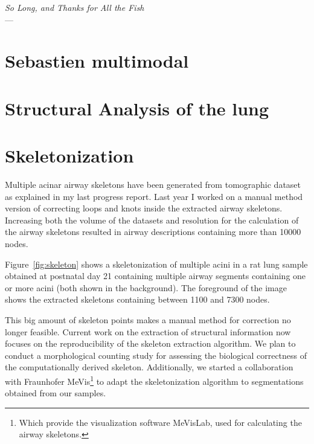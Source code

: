 \acresetall
{}\label{ch:outlook}
\begin{flushright}{\slshape    
		So Long, and Thanks for All the Fish} \\ \medskip
    ---  \citep{Adams1984}
\end{flushright}
\vspace{52mm}

\section{Sebastien multimodal}

\section{Structural Analysis of the lung}

\section{Skeletonization}
Multiple acinar airway skeletons have been generated from tomographic dataset as explained in my last progress report. Last year I worked on a manual method version of correcting loops and knots inside the extracted airway skeletons. Increasing both the volume of the datasets and resolution for the calculation of the airway skeletons resulted in airway descriptions containing more than \num{10000} nodes.

Figure~\ref{fig:skeleton} shows a skeletonization of multiple acini in a rat lung sample obtained at postnatal day 21 containing multiple airway segments containing one or more acini (both shown in the background). The foreground of the image shows the extracted skeletons containing between \num{1100} and \num{7300} nodes.

This big amount of skeleton points makes a manual method for correction no longer feasible. Current work on the extraction of structural information now focuses on the reproducibility of the skeleton extraction algorithm. We plan to conduct a morphological counting study for assessing the biological correctness of the computationally derived skeleton. Additionally, we started a collaboration with Fraunhofer MeVis\footnote{Which provide the visualization software MeVisLab, used for calculating the airway skeletons.} to adapt the skeletonization algorithm to segmentations obtained from our samples.

